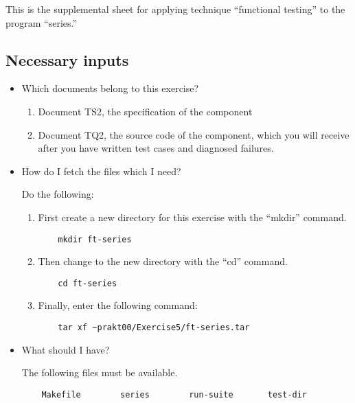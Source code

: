 
This is the supplemental sheet 
for applying technique ``functional testing''
to the program ``series.''


\subsection*{Necessary inputs}

\begin{itemize}

\item Which documents belong to this exercise?

\begin{enumerate}
\item Document TS2, the specification of the component
\item Document TQ2, the source code of the component, which you will
receive after you have written test cases and diagnosed failures.
\end{enumerate}

\item How do I fetch the files which I need?

Do the following:

\begin{enumerate}

\item First create a new directory for this exercise with the
``mkdir'' command.
\begin{verbatim}
    mkdir ft-series
\end{verbatim}

\item Then change to the new directory with the ``cd'' command.
\begin{verbatim}
    cd ft-series
\end{verbatim}

\item Finally, enter the following command:
\begin{path}
\begin{verbatim}
    tar xf ~prakt00/Exercise5/ft-series.tar
\end{verbatim}
\end{path}

\end{enumerate}


\item What should I have?

The following files must be available.
\begin{verbatim}
    Makefile        series        run-suite       test-dir
\end{verbatim}

\end{itemize}


